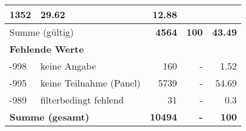 \begin{longtable}{lXrrr}
       \num{1352} &
       \num[round-mode=places,round-precision=2]{29,62} &
         \num[round-mode=places,round-precision=2]{12,88} \\
     \midrule
     \multicolumn{2}{l}{Summe (gültig)} &
       \textbf{\num{4564}} &
     \textbf{100} &
       \textbf{\num[round-mode=places,round-precision=2]{43,49}} \\
     \multicolumn{5}{l}{\textbf{Fehlende Werte}}\\
       -998 &
       keine Angabe &
         \num{160} &
        - &
         \num[round-mode=places,round-precision=2]{1,52} \\
       -995 &
       keine Teilnahme (Panel) &
         \num{5739} &
        - &
         \num[round-mode=places,round-precision=2]{54,69} \\
       -989 &
       filterbedingt fehlend &
         \num{31} &
        - &
         \num[round-mode=places,round-precision=2]{0,3} \\
     \midrule
     \multicolumn{2}{l}{\textbf{Summe (gesamt)}} &
          \textbf{\num{10494}} &
        \textbf{-} &
        \textbf{100} \\
     \bottomrule
     \end{longtable}
     

